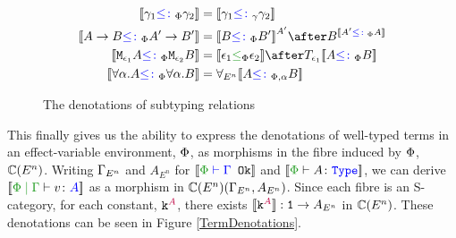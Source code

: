 \documentclass{Report}
\begin{document}
\begin{figure}[H]
    \centering
    \begin{framed}
        \begin{align*}
            \deno{\g_1\subtypep \g_2} &= \deno{\g_1\subtypeg \g_2}
            \\
            \deno{\ab \subtypep \fntype{A'}{B'}} &= \deno{B\subtypep B'}^{A'}\after B^{\deno{A'\subtypep A}}
            \\
            \deno{\M{\e_1}{A}\subtypep\M{\e_2}{B}} &= \deno{\e_1\subeffectp\e_2}\after\T{\e_1}{\deno{A\subtypep B}}
            \\
            \deno{\all{\a}{A}\subtypep\all{\a}{B}} &= \allEn{\deno{A\subtypepa B}}
        \end{align*}
    \end{framed}
    
    \caption{The denotations of subtyping relations}
    \label{SubtypingDenotations}
\end{figure}


This finally gives us the ability to express the denotations of well-typed terms in an effect-variable environment, $\P$, as morphisms in the fibre induced by $\P$, $\C(E^n)$.  Writing $\G_{E^n}$ and $A_{E^n}$ for $\deno{\wellformedok{\P}{\G}}$ and $\deno{\typerelation{\P}{A}{\type}}$, we can derive $\deno{\gpetyperelation{v}{A}}$ as a morphism in $\C(E^n)(\G_{E^n}, A_{E^n})$. Since each fibre is an S-category, for each constant, $\const{A}$, there exists $\deno{\const{A}}: \1 \rightarrow A_{E^n}$ in $\C(E^n)$. These denotations can be seen in Figure \ref{TermDenotations}.
\end{document}

